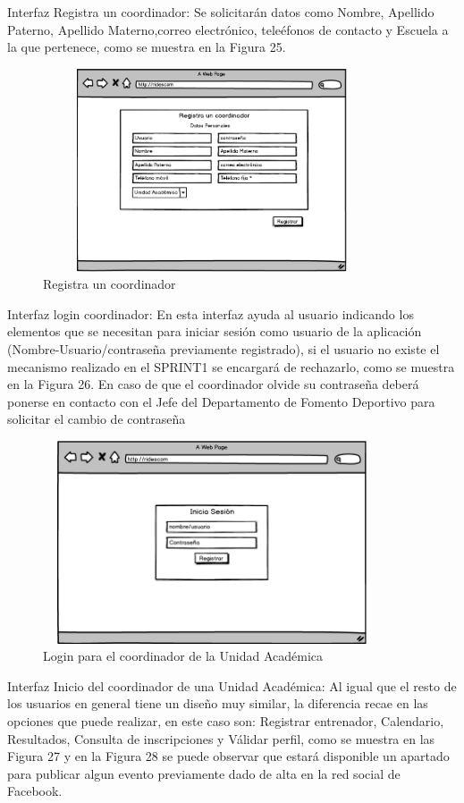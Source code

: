 	Interfaz Registra un coordinador: Se solicitarán datos como Nombre, Apellido Paterno, Apellido Materno,correo electrónico, teleéfonos de contacto y Escuela a la que pertenece, como se muestra en la Figura 25.
	\begin{figure}[hbt!]
		\centering
		\includegraphics[width=10cm, height=6cm]{Imagenes/Disenos/Registrocoordinador.png}
		\caption{Registra un coordinador}
	\end{figure}
	
	Interfaz login coordinador: En esta interfaz ayuda al usuario indicando los elementos que se necesitan para iniciar sesión como usuario de la aplicación (Nombre-Usuario/contraseña previamente registrado), si el usuario no existe el mecanismo realizado en el SPRINT1 se encargará de rechazarlo, como se muestra en la Figura 26. En caso de que el coordinador olvide su contraseña deberá ponerse en contacto con el Jefe del Departamento de Fomento Deportivo para solicitar el cambio de contraseña \pagebreak
	\begin{figure}[hbt!]
		\centering
		\includegraphics[width=10cm, height=6cm]{Imagenes/Disenos/LogincoordinadorUA.png}
		\caption{Login para el coordinador de la Unidad Académica}
	\end{figure}
	
	Interfaz  Inicio del coordinador de una Unidad Académica: Al igual que el resto de los usuarios en general tiene un diseño muy similar, la diferencia recae en las opciones que puede realizar, en este caso son: Registrar entrenador, Calendario, Resultados, Consulta de inscripciones y Válidar perfil, como se muestra en las Figura 27 y en la Figura 28 se puede observar que estará disponible un apartado para publicar algun evento previamente dado de alta en la red social de Facebook.
	
